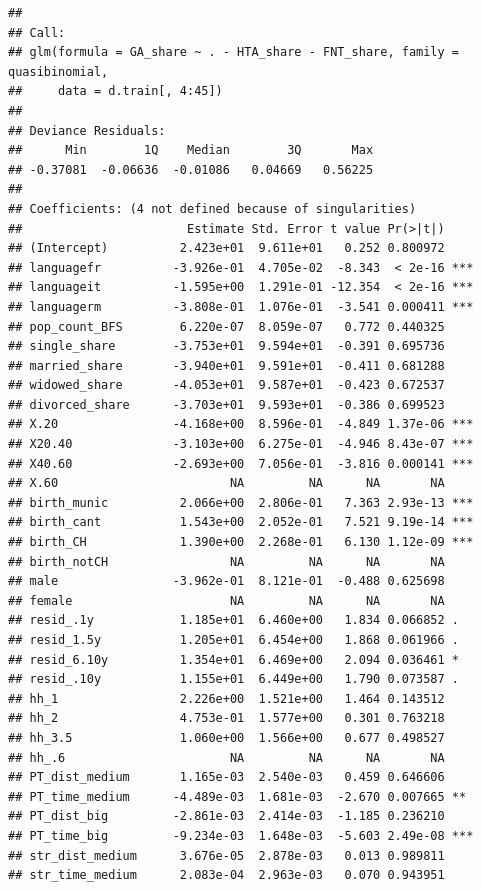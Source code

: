 \documentclass[
]{article}
\begin{document}
\begin{verbatim}
## 
## Call:
## glm(formula = GA_share ~ . - HTA_share - FNT_share, family = quasibinomial, 
##     data = d.train[, 4:45])
## 
## Deviance Residuals: 
##      Min        1Q    Median        3Q       Max  
## -0.37081  -0.06636  -0.01086   0.04669   0.56225  
## 
## Coefficients: (4 not defined because of singularities)
##                       Estimate Std. Error t value Pr(>|t|)    
## (Intercept)          2.423e+01  9.611e+01   0.252 0.800972    
## languagefr          -3.926e-01  4.705e-02  -8.343  < 2e-16 ***
## languageit          -1.595e+00  1.291e-01 -12.354  < 2e-16 ***
## languagerm          -3.808e-01  1.076e-01  -3.541 0.000411 ***
## pop_count_BFS        6.220e-07  8.059e-07   0.772 0.440325    
## single_share        -3.753e+01  9.594e+01  -0.391 0.695736    
## married_share       -3.940e+01  9.591e+01  -0.411 0.681288    
## widowed_share       -4.053e+01  9.587e+01  -0.423 0.672537    
## divorced_share      -3.703e+01  9.593e+01  -0.386 0.699523    
## X.20                -4.168e+00  8.596e-01  -4.849 1.37e-06 ***
## X20.40              -3.103e+00  6.275e-01  -4.946 8.43e-07 ***
## X40.60              -2.693e+00  7.056e-01  -3.816 0.000141 ***
## X.60                        NA         NA      NA       NA    
## birth_munic          2.066e+00  2.806e-01   7.363 2.93e-13 ***
## birth_cant           1.543e+00  2.052e-01   7.521 9.19e-14 ***
## birth_CH             1.390e+00  2.268e-01   6.130 1.12e-09 ***
## birth_notCH                 NA         NA      NA       NA    
## male                -3.962e-01  8.121e-01  -0.488 0.625698    
## female                      NA         NA      NA       NA    
## resid_.1y            1.185e+01  6.460e+00   1.834 0.066852 .  
## resid_1.5y           1.205e+01  6.454e+00   1.868 0.061966 .  
## resid_6.10y          1.354e+01  6.469e+00   2.094 0.036461 *  
## resid_.10y           1.155e+01  6.449e+00   1.790 0.073587 .  
## hh_1                 2.226e+00  1.521e+00   1.464 0.143512    
## hh_2                 4.753e-01  1.577e+00   0.301 0.763218    
## hh_3.5               1.060e+00  1.566e+00   0.677 0.498527    
## hh_.6                       NA         NA      NA       NA    
## PT_dist_medium       1.165e-03  2.540e-03   0.459 0.646606    
## PT_time_medium      -4.489e-03  1.681e-03  -2.670 0.007665 ** 
## PT_dist_big         -2.861e-03  2.414e-03  -1.185 0.236210    
## PT_time_big         -9.234e-03  1.648e-03  -5.603 2.49e-08 ***
## str_dist_medium      3.676e-05  2.878e-03   0.013 0.989811    
## str_time_medium      2.083e-04  2.963e-03   0.070 0.943951    

\end{verbatim}
\end{document}
